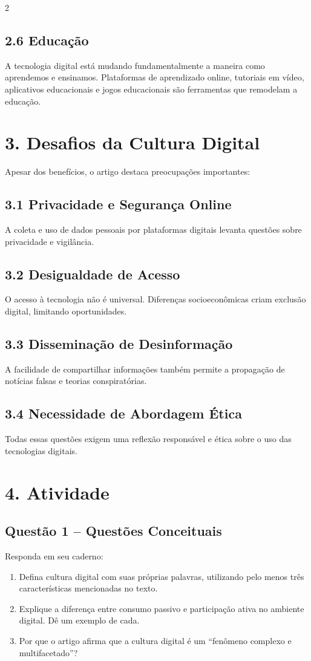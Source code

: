 \documentclass[12pt]{article}
\begin{document}
\begin{multicols}{2}
\subsection*{2.6 Educação}
A tecnologia digital está mudando fundamentalmente a maneira como aprendemos e ensinamos. Plataformas de aprendizado online, tutoriais em vídeo, aplicativos educacionais e jogos educacionais são ferramentas que remodelam a educação.

\section*{3. Desafios da Cultura Digital}
Apesar dos benefícios, o artigo destaca preocupações importantes:

\subsection*{3.1 Privacidade e Segurança Online}
A coleta e uso de dados pessoais por plataformas digitais levanta questões sobre privacidade e vigilância.

\subsection*{3.2 Desigualdade de Acesso}
O acesso à tecnologia não é universal. Diferenças socioeconômicas criam exclusão digital, limitando oportunidades.

\subsection*{3.3 Disseminação de Desinformação}
A facilidade de compartilhar informações também permite a propagação de notícias falsas e teorias conspiratórias.

\subsection*{3.4 Necessidade de Abordagem Ética}
Todas essas questões exigem uma reflexão responsável e ética sobre o uso das tecnologias digitais.

\section*{4. Atividade}
\subsection*{Questão 1 – Questões Conceituais}
Responda em seu caderno:
\begin{enumerate}[label=\alph*)]
    \item Defina cultura digital com suas próprias palavras, utilizando pelo menos três características mencionadas no texto.
    \item Explique a diferença entre consumo passivo e participação ativa no ambiente digital. Dê um exemplo de cada.
    \item Por que o artigo afirma que a cultura digital é um “fenômeno complexo e multifacetado”?
\end{enumerate}


\end{multicols}
\end{document}
